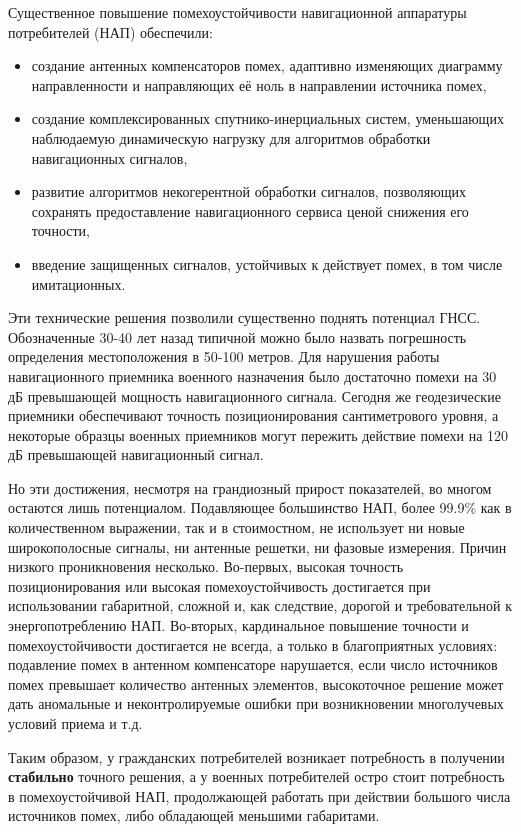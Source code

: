 Существенное повышение помехоустойчивости навигационной аппаратуры потребителей (НАП) обеспечили:
\begin{itemize}
\item создание антенных компенсаторов помех, адаптивно изменяющих диаграмму направленности и направляющих её ноль в направлении источника помех,
\item создание комплексированных спутнико-инерциальных систем, уменьшающих наблюдаемую динамическую нагрузку для алгоритмов обработки навигационных сигналов,
\item развитие алгоритмов некогерентной обработки сигналов, позволяющих сохранять предоставление навигационного сервиса ценой снижения его точности,
\item введение защищенных сигналов, устойчивых к действует помех, в том числе имитационных.
\end{itemize}

Эти технические решения позволили существенно поднять потенциал ГНСС. 
Обозначенные 30-40 лет назад типичной можно было назвать погрешность определения местоположения в 50-100 метров. 
Для нарушения работы навигационного приемника военного назначения было достаточно помехи на 30 дБ превышающей мощность навигационного сигнала. 
Сегодня же геодезические приемники обеспечивают точность позиционирования сантиметрового уровня, а некоторые образцы военных приемников могут пережить действие помехи на 120 дБ превышающей навигационный сигнал. 

Но эти достижения, несмотря на грандиозный прирост показателей, во многом остаются лишь потенциалом. 
Подавляющее большинство НАП, более 99.9\% как в количественном выражении, так и в стоимостном, не использует ни новые широкополосные сигналы, ни антенные решетки, ни фазовые измерения. 
Причин низкого проникновения несколько. 
Во-первых, высокая точность позиционирования или высокая помехоустойчивость достигается при использовании габаритной, сложной и, как следствие, дорогой и требовательной к энергопотреблению НАП. 
Во-вторых, кардинальное повышение точности и помехоустойчивости достигается не всегда, а только в благоприятных условиях: 
подавление помех в антенном компенсаторе нарушается, если число источников помех превышает количество антенных элементов, 
высокоточное решение может дать аномальные и неконтролируемые ошибки при возникновении многолучевых условий приема и т.д.

Таким образом, у гражданских потребителей возникает потребность в получении \textbf{стабильно} точного решения, а у военных потребителей остро стоит потребность в помехоустойчивой НАП, продолжающей работать при действии большого числа источников помех, либо обладающей меньшими габаритами. 

